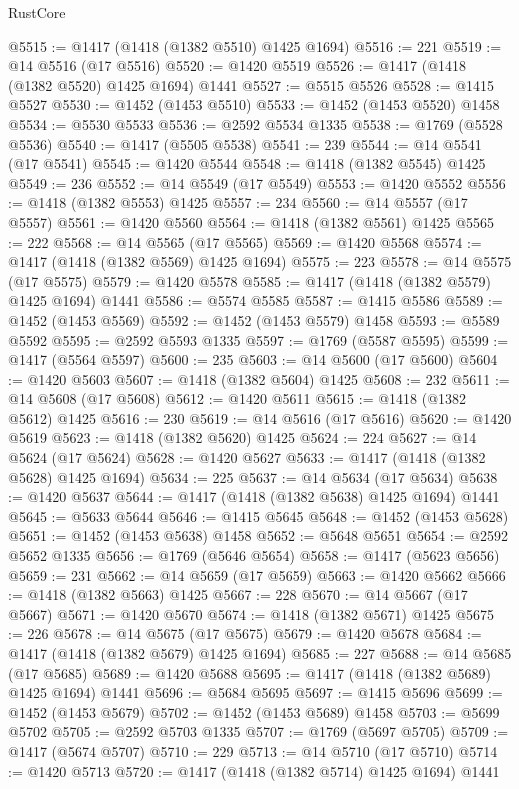 \begin{lexlean}{RustCore}
\begin{coremodule}
@5515 := @1417 (@1418 (@1382 @5510) @1425 @1694)
@5516 := 221
@5519 := @14 @5516 (@17 @5516)
@5520 := @1420 @5519
@5526 := @1417 (@1418 (@1382 @5520) @1425 @1694) @1441
@5527 := @5515 @5526
@5528 := @1415 @5527
@5530 := @1452 (@1453 @5510)
@5533 := @1452 (@1453 @5520) @1458
@5534 := @5530 @5533
@5536 := @2592 @5534 @1335
@5538 := @1769 (@5528 @5536)
@5540 := @1417 (@5505 @5538)
@5541 := 239
@5544 := @14 @5541 (@17 @5541)
@5545 := @1420 @5544
@5548 := @1418 (@1382 @5545) @1425
@5549 := 236
@5552 := @14 @5549 (@17 @5549)
@5553 := @1420 @5552
@5556 := @1418 (@1382 @5553) @1425
@5557 := 234
@5560 := @14 @5557 (@17 @5557)
@5561 := @1420 @5560
@5564 := @1418 (@1382 @5561) @1425
@5565 := 222
@5568 := @14 @5565 (@17 @5565)
@5569 := @1420 @5568
@5574 := @1417 (@1418 (@1382 @5569) @1425 @1694)
@5575 := 223
@5578 := @14 @5575 (@17 @5575)
@5579 := @1420 @5578
@5585 := @1417 (@1418 (@1382 @5579) @1425 @1694) @1441
@5586 := @5574 @5585
@5587 := @1415 @5586
@5589 := @1452 (@1453 @5569)
@5592 := @1452 (@1453 @5579) @1458
@5593 := @5589 @5592
@5595 := @2592 @5593 @1335
@5597 := @1769 (@5587 @5595)
@5599 := @1417 (@5564 @5597)
@5600 := 235
@5603 := @14 @5600 (@17 @5600)
@5604 := @1420 @5603
@5607 := @1418 (@1382 @5604) @1425
@5608 := 232
@5611 := @14 @5608 (@17 @5608)
@5612 := @1420 @5611
@5615 := @1418 (@1382 @5612) @1425
@5616 := 230
@5619 := @14 @5616 (@17 @5616)
@5620 := @1420 @5619
@5623 := @1418 (@1382 @5620) @1425
@5624 := 224
@5627 := @14 @5624 (@17 @5624)
@5628 := @1420 @5627
@5633 := @1417 (@1418 (@1382 @5628) @1425 @1694)
@5634 := 225
@5637 := @14 @5634 (@17 @5634)
@5638 := @1420 @5637
@5644 := @1417 (@1418 (@1382 @5638) @1425 @1694) @1441
@5645 := @5633 @5644
@5646 := @1415 @5645
@5648 := @1452 (@1453 @5628)
@5651 := @1452 (@1453 @5638) @1458
@5652 := @5648 @5651
@5654 := @2592 @5652 @1335
@5656 := @1769 (@5646 @5654)
@5658 := @1417 (@5623 @5656)
@5659 := 231
@5662 := @14 @5659 (@17 @5659)
@5663 := @1420 @5662
@5666 := @1418 (@1382 @5663) @1425
@5667 := 228
@5670 := @14 @5667 (@17 @5667)
@5671 := @1420 @5670
@5674 := @1418 (@1382 @5671) @1425
@5675 := 226
@5678 := @14 @5675 (@17 @5675)
@5679 := @1420 @5678
@5684 := @1417 (@1418 (@1382 @5679) @1425 @1694)
@5685 := 227
@5688 := @14 @5685 (@17 @5685)
@5689 := @1420 @5688
@5695 := @1417 (@1418 (@1382 @5689) @1425 @1694) @1441
@5696 := @5684 @5695
@5697 := @1415 @5696
@5699 := @1452 (@1453 @5679)
@5702 := @1452 (@1453 @5689) @1458
@5703 := @5699 @5702
@5705 := @2592 @5703 @1335
@5707 := @1769 (@5697 @5705)
@5709 := @1417 (@5674 @5707)
@5710 := 229
@5713 := @14 @5710 (@17 @5710)
@5714 := @1420 @5713
@5720 := @1417 (@1418 (@1382 @5714) @1425 @1694) @1441

\end{coremodule}
\end{lexlean}
